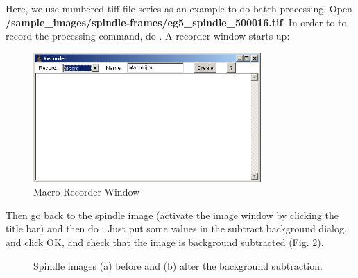 \begin{indentexercise}{1}
Here, we use numbered-tiff file series as an example to do batch
processing. Open
\textbf{/sample\_images/spindle-frames/eg5\_spindle\_500016.tif}. In order to
to record the processing command, do . A recorder window starts up:

\begin{figure}[htbp]
\begin{center}
\includegraphics[width=8.678cm,height=4.942cm]{fig/CMCIBasicCourse201102-img70.png}
\caption{ Macro Recorder Window}
\label{fig:img70}
\end{center}
\end{figure}


Then go back to the spindle image (activate the image window by clicking
the title bar) and then do . Just put some values in the subtract background dialog,
and click OK, and check that the image is background subtracted (Fig. \ref{fig:spindleBacksubtraction}). 


\begin{figure}[htbp]
 \centering
 \caption{ Spindle images (a) before and (b) after the
background subtraction.}
 \label{fig:spindleBacksubtraction}
\end{figure} 



\end{indentexercise}
